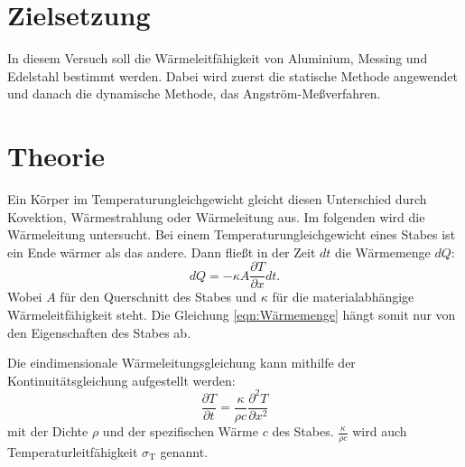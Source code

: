 \section{Zielsetzung}
\label{Zielsetzung}
In diesem Versuch soll die Wärmeleitfähigkeit von Aluminium, Messing und Edelstahl bestimmt werden.
Dabei wird zuerst die statische Methode angewendet und danach die dynamische Methode, das Angström-Meßverfahren.

\section{Theorie}
\label{Theorie}
Ein Körper im Temperaturungleichgewicht gleicht diesen Unterschied durch Kovektion, Wärmestrahlung oder Wärmeleitung aus.
Im folgenden wird die Wärmeleitung untersucht.
Bei einem Temperaturungleichgewicht eines Stabes ist ein Ende wärmer als das andere.
Dann fließt in der Zeit $dt$ die Wärmemenge $dQ$:
\begin{equation}
    \label{eqn:Wärmemenge}
    dQ = -\kappa A \frac{\partial T}{\partial x}dt .
\end{equation}
Wobei $A$ für den Querschnitt des Stabes und $\kappa$ für die materialabhängige Wärmeleitfähigkeit steht.
Die Gleichung \eqref{eqn:Wärmemenge} hängt somit nur von den Eigenschaften des Stabes ab.

Die eindimensionale Wärmeleitungsgleichung kann mithilfe der Kontinuitätsgleichung aufgestellt werden:
\begin{equation}
    \frac{\partial T}{\partial t} = \frac{\kappa}{\rho c} \frac{\partial^2 T}{\partial x^2}
\end{equation}
mit der Dichte $\rho$ und der spezifischen Wärme $c$ des Stabes.
$\frac{\kappa}{\rho c}$ wird auch Temperaturleitfähigkeit $\sigma_\text{T}$ genannt.

